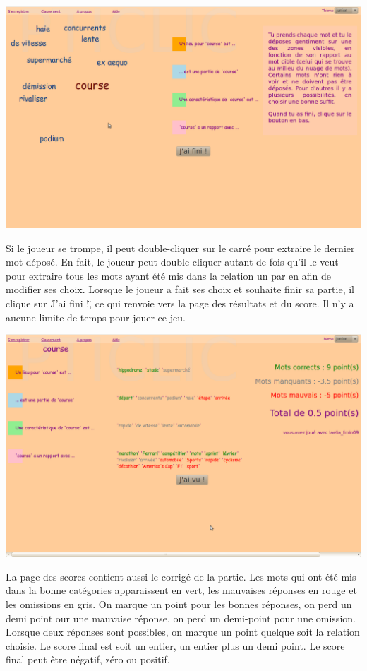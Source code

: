\documentclass[a4paper,11pt,french]{article}
\begin{document}
\begin{center}
\includegraphics[width=14cm]{img/PtiClicJeu2.png}
\end{center}

Si le joueur se trompe, il peut double-cliquer sur le carré pour extraire le dernier mot déposé. En fait, le joueur peut double-cliquer autant de fois qu'il le veut pour extraire tous les mots ayant été mis dans la relation un par en afin de modifier ses choix. Lorsque le joueur a fait ses choix et souhaite finir sa partie, il clique sur \"J'ai fini !\", ce qui renvoie vers la page des résultats et du score. Il n'y a aucune limite de temps pour jouer ce jeu.

\begin{center}
\includegraphics[width=14cm]{img/PtiClicResultats.png}
\end{center}

La page des scores contient aussi le corrigé de la partie. Les mots qui ont été mis dans la bonne catégories apparaissent en vert, les mauvaises réponses en rouge et les omissions en gris. On marque un point pour les bonnes réponses, on perd un demi point our une mauvaise réponse, on perd un demi-point pour une omission. Lorsque deux réponses sont possibles, on marque un point quelque soit la relation choisie. Le score final est soit un entier, un entier plus un demi point. Le score final peut être négatif, zéro ou positif. 
\end{document}
